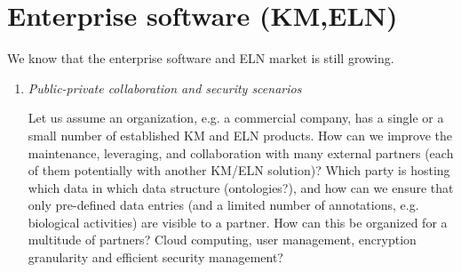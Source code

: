 \documentclass{sig-alternate}
\begin{document}
\section*{Enterprise software (KM,ELN)}
We know that the enterprise software and ELN market is still growing.
\begin{enumerate}
\item \emph{Public-private collaboration and security scenarios}

Let us assume an organization, e.g. a commercial company, has a single or a small number of established KM and ELN products. 
How can we improve the maintenance, leveraging, and collaboration with many external partners (each of them potentially
with another KM/ELN solution)? Which party is hosting which data in which data structure (ontologies?), and 
how can we ensure that only pre-defined data entries 
(and a limited number of annotations, e.g. biological activities) are visible to a partner.
How can this be organized for a multitude of partners? Cloud computing, user management, encryption granularity and efficient security management?
\end{enumerate}



\end{document}
